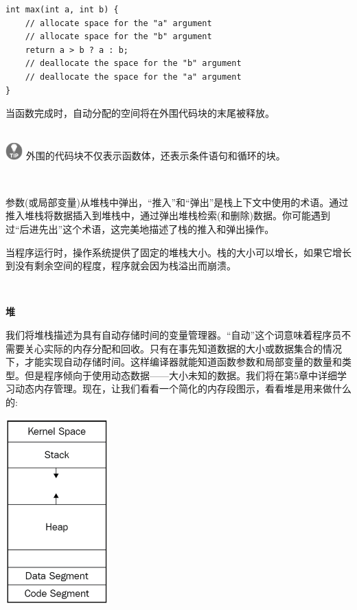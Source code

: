 \begin{lstlisting}[caption={}]
int max(int a, int b) {
	// allocate space for the "a" argument
	// allocate space for the "b" argument
	return a > b ? a : b;
	// deallocate the space for the "b" argument
	// deallocate the space for the "a" argument
}
\end{lstlisting}

当函数完成时，自动分配的空间将在外围代码块的末尾被释放。 \par

\hspace*{\fill} \\ %
\includegraphics[width=0.05\textwidth]{images/tip}
外围的代码块不仅表示函数体，还表示条件语句和循环的块。 \par
\noindent\textbf{}\ \par

参数(或局部变量)从堆栈中弹出，“推入”和“弹出”是栈上下文中使用的术语。通过推入堆栈将数据插入到堆栈中，通过弹出堆栈检索(和删除)数据。你可能遇到过“后进先出”这个术语，这完美地描述了栈的推入和弹出操作。\par
当程序运行时，操作系统提供了固定的堆栈大小。栈的大小可以增长，如果它增长到没有剩余空间的程度，程序就会因为栈溢出而崩溃。 \par

\noindent\textbf{}\ \par
\textbf{堆} \ \par
我们将堆栈描述为具有自动存储时间的变量管理器。“自动”这个词意味着程序员不需要关心实际的内存分配和回收。只有在事先知道数据的大小或数据集合的情况下，才能实现自动存储时间。这样编译器就能知道函数参数和局部变量的数量和类型。但是程序倾向于使用动态数据——大小未知的数据。我们将在第5章中详细学习动态内存管理。现在，让我们看看一个简化的内存段图示，看看堆是用来做什么的:\par

\begin{center}
	\includegraphics[width=0.3\textwidth]{content/Section-1/Chapter-2/12}
\end{center}

